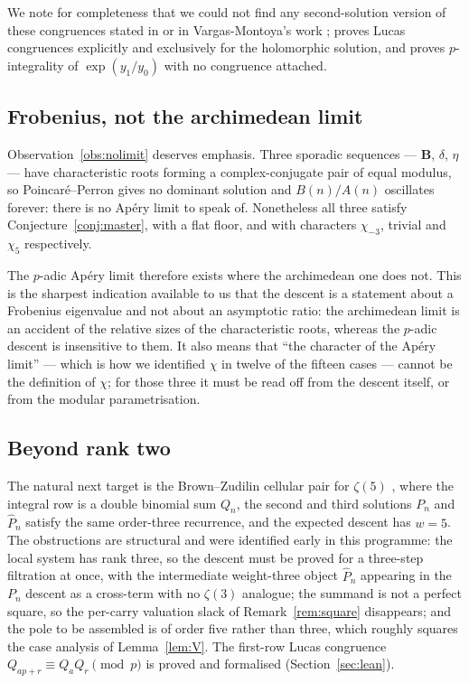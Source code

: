 We note for completeness that we could not find any second-solution version of these
congruences stated in \cite{BVthree} or in Vargas-Montoya's work
\cite{VMcanon,VMmum}; \cite{VMmum} proves Lucas congruences explicitly and exclusively for
the holomorphic solution, and \cite{VMcanon} proves $p$-integrality of $\exp(y_1/y_0)$
with no congruence attached.

\subsection{Frobenius, not the archimedean limit}
\label{ssec:frobenius}

Observation~\ref{obs:nolimit} deserves emphasis. Three sporadic sequences --- $\mathbf B$,
$\delta$, $\eta$ --- have characteristic roots forming a complex-conjugate pair of equal
modulus, so Poincar\'e--Perron gives no dominant solution and $B(n)/A(n)$ oscillates
forever: there is no Ap\'ery limit to speak of. Nonetheless all three satisfy
Conjecture~\ref{conj:master}, with a flat floor, and with characters $\chi_{-3}$, trivial
and $\chi_5$ respectively.

The $p$-adic Ap\'ery limit therefore exists where the archimedean one does not. This is
the sharpest indication available to us that the descent is a statement about a Frobenius
eigenvalue and not about an asymptotic ratio: the archimedean limit is an accident of the
relative sizes of the characteristic roots, whereas the $p$-adic descent is insensitive to
them. It also means that ``the character of the Ap\'ery limit'' --- which is how we
identified $\chi$ in twelve of the fifteen cases --- cannot be the definition of $\chi$;
for those three it must be read off from the descent itself, or from the modular
parametrisation.

\subsection{Beyond rank two}
\label{ssec:rank3}

The natural next target is the Brown--Zudilin cellular pair for $\zeta(5)$
\cite{BrownZudilin}, where the integral row is a double binomial sum $Q_n$, the second and
third solutions $P_n$ and $\widehat P_n$ satisfy the same order-three recurrence, and the
expected descent has $w=5$. The obstructions are structural and were identified early in
this programme: the local system has rank three, so the descent must be proved for a
three-step filtration at once, with the intermediate weight-three object $\widehat P_n$
appearing in the $P_n$ descent as a cross-term with no $\zeta(3)$ analogue; the summand is
not a perfect square, so the per-carry valuation slack of Remark~\ref{rem:square}
disappears; and the pole to be assembled is of order five rather than three, which roughly
squares the case analysis of Lemma~\ref{lem:V}. The first-row Lucas congruence
$Q_{ap+r}\equiv Q_aQ_r\pmod p$ is proved and formalised (Section~\ref{sec:lean}).

